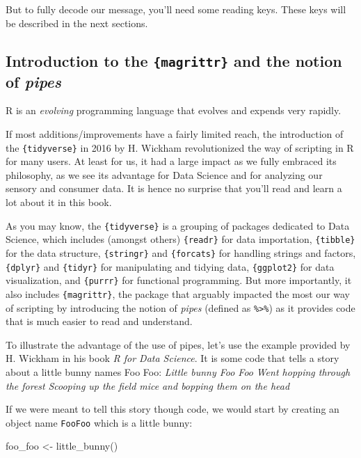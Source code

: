 \documentclass[
]{book}
\newenvironment{Shaded}{\begin{snugshade}}{\end{snugshade}}
\newcommand{\FunctionTok}[1]{\textcolor[rgb]{0.00,0.00,0.00}{#1}}
\newcommand{\NormalTok}[1]{#1}
\newcommand{\OtherTok}[1]{\textcolor[rgb]{0.56,0.35,0.01}{#1}}
\begin{document}
But to fully decode our message, you'll need some reading keys. These keys will be described in the next sections.

\hypertarget{introduction-to-the-magrittr-and-the-notion-of-pipes}{%
\subsection{\texorpdfstring{Introduction to the \texttt{\{magrittr\}} and the notion of \emph{pipes}}{Introduction to the \{magrittr\} and the notion of pipes}}\label{introduction-to-the-magrittr-and-the-notion-of-pipes}}

R is an \emph{evolving} programming language that evolves and expends very rapidly.

If most additions/improvements have a fairly limited reach, the introduction of the \texttt{\{tidyverse\}} in 2016 by H. Wickham revolutionized the way of scripting in R for many users. At least for us, it had a large impact as we fully embraced its philosophy, as we see its advantage for Data Science and for analyzing our sensory and consumer data. It is hence no surprise that you'll read and learn a lot about it in this book.

As you may know, the \texttt{\{tidyverse\}} is a grouping of packages dedicated to Data Science, which includes (amongst others) \texttt{\{readr\}} for data importation, \texttt{\{tibble\}} for the data structure, \texttt{\{stringr\}} and \texttt{\{forcats\}} for handling strings and factors, \texttt{\{dplyr\}} and \texttt{\{tidyr\}} for manipulating and tidying data, \texttt{\{ggplot2\}} for data visualization, and \texttt{\{purrr\}} for functional programming. But more importantly, it also includes \texttt{\{magrittr\}}, the package that arguably impacted the most our way of scripting by introducing the notion of \emph{pipes} (defined as \texttt{\%\textgreater{}\%}) as it provides code that is much easier to read and understand.

To illustrate the advantage of the use of pipes, let's use the example provided by H. Wickham in his book \emph{R for Data Science}.
It is some code that tells a story about a little bunny names Foo Foo:
\emph{Little bunny Foo Foo}
\emph{Went hopping through the forest}
\emph{Scooping up the field mice}
\emph{and bopping them on the head}

If we were meant to tell this story though code, we would start by creating an object name \texttt{FooFoo} which is a little bunny:

\begin{Shaded}
\begin{Highlighting}[]
\NormalTok{foo\_foo }\OtherTok{\textless{}{-}} \FunctionTok{little\_bunny}\NormalTok{()}
\end{Highlighting}
\end{Shaded}
\end{document}

